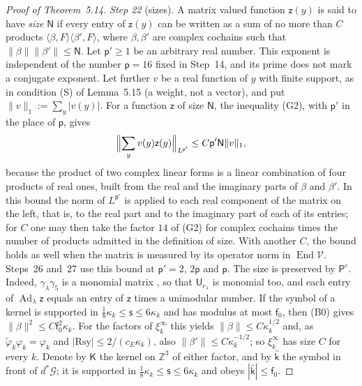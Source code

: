 \documentclass[11pt,letterpaper,reqno]{amsart}
\theoremstyle{definition}
\begin{document}
\begin{proof}[Proof of Theorem~5.14]
\emph{Step 22} (sizes).
A matrix valued function $\mathsf z(y)$ is said to have \emph{size} $\mathsf N$ if every entry of $\mathsf z(y)$ can be written as a sum of no more than $C$ products $\langle\beta,F\rangle\langle\beta',F\rangle$, where $\beta,\beta'$ are complex cochains such that $\|\beta\|\|\beta'\|\le\mathsf N$.
Let $\mathsf p'\ge1$ be an arbitrary real number.
This exponent is independent of the number $\mathsf p=16$ fixed in Step~14, and its prime does not mark a conjugate exponent.
Let further $v$ be a real function of $y$ with finite support, as in condition (S) of Lemma~5.15 (a weight, not a vector), and put $\|v\|_1:=\sum_y|v(y)|$.
For a function $\mathsf z$ of size $\mathsf N$, the inequality (G2), with $\mathsf p'$ in the place of $\mathsf p$, gives
\begin{equation*}
\Bigl\|\sum_yv(y)\mathsf z(y)\Bigr\|_{L^{\mathsf p'}}\le C\mathsf p'\mathsf N\|v\|_1,
\end{equation*}
because the product of two complex linear forms is a linear combination of four products of real ones, built from the real and the imaginary parts of $\beta$ and $\beta'$.
In this bound the norm of $L^{\mathsf p'}$ is applied to each real component of the matrix on the left, that is, to the real part and to the imaginary part of each of its entries;
for $C$ one may then take the factor $14$ of (G2) for complex cochains times the number of products admitted in the definition of size.
With another $C$, the bound holds as well when the matrix is measured by its operator norm in $\operatorname{End}\mathcal V$.
Steps~26 and~27 use this bound at $\mathsf p'=2$, $2\mathsf p$ and $\mathsf p$.
The size is preserved by $\mathsf P^\varepsilon$.
Indeed, $\gamma_\lambda\gamma_5$ is a monomial matrix \cite[(I.c6)]{QEDIII}, so that $\mathsf U_{r_\lambda}$ is monomial too, and each entry of $\operatorname{Ad}_\lambda\mathsf z$ equals an entry of $\mathsf z$ times a unimodular number.
If the symbol of a kernel is supported in $\frac18\kappa_k\le\mathsf s\le6\kappa_k$ and has modulus at most $\mathsf f_0$, then (B0) gives $\|\beta\|^2\le C\mathsf f_0^2\kappa_k$.
For the factors of $\xi_k^\infty$ this yields $\|\beta\|\le C\kappa_k^{1/2}$ and, as $\tilde\varphi_k\varphi_k=\varphi_k$ and $|\mathrm{Rsy}|\le2/(c_E\kappa_k)$, also $\|\beta'\|\le C\kappa_k^{-1/2}$; so $\xi_k^\infty$ has size $C$ for every $k$.
Denote by $\mathsf K$ the kernel on $\mathbb Z^3$ of either factor, and by $\hat{\mathsf k}$ the symbol in front of $d^*\mathcal G$; it is supported in $\frac18\kappa_k\le\mathsf s\le6\kappa_k$ and obeys $|\hat{\mathsf k}|\le\mathsf f_0$.

\end{proof}
\end{document}
